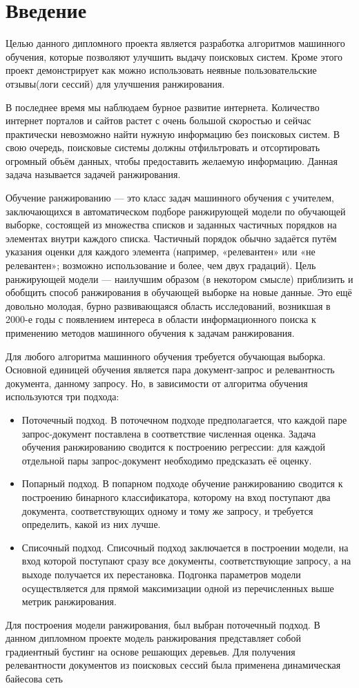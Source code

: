 \section*{Введение}

Целью данного дипломного проекта является разработка алгоритмов машинного обучения, которые позволяют улучшить выдачу поисковых систем. Кроме этого проект демонстрирует как можно использовать неявные пользовательские отзывы(логи сессий) для улучшения ранжирования. 

В последнее время мы наблюдаем бурное развитие интернета. Количество интернет порталов и сайтов растет с очень большой скоростью и сейчас практически невозможно найти нужную информацию без поисковых систем. В свою очередь, поисковые системы должны отфильтровать и отсортировать огромный объём данных, чтобы предоставить желаемую информацию. Данная задача называется задачей ранжирования. 

Обучение ранжированию — это класс задач машинного обучения с учителем, заключающихся в автоматическом подборе ранжирующей модели по обучающей выборке, состоящей из множества списков и заданных частичных порядков на элементах внутри каждого списка. Частичный порядок обычно задаётся путём указания оценки для каждого элемента (например, «релевантен» или «не релевантен»; возможно использование и более, чем двух градаций). Цель ранжирующей модели — наилучшим образом (в некотором смысле) приблизить и обобщить способ ранжирования в обучающей выборке на новые данные. Это ещё довольно молодая, бурно развивающаяся область исследований, возникшая в 2000-е годы с появлением интереса в области информационного поиска к применению методов машинного обучения к задачам ранжирования.

Для любого алгоритма машинного обучения требуется обучающая выборка. Основной единицей обучения является пара документ-запрос и релевантность документа, данному запросу. Но, в зависимости от алгоритма обучения используются три подхода: 
\begin{itemize}

	\item Поточечный подход. В поточечном подходе предполагается, что каждой паре запрос-документ поставлена в соответствие численная оценка. Задача обучения ранжированию сводится к построению регрессии: для каждой отдельной пары запрос-документ необходимо предсказать её оценку.

	\item Попарный подход. В попарном подходе обучение ранжированию сводится к построению бинарного классификатора, которому на вход поступают два документа, соответствующих одному и тому же запросу, и требуется определить, какой из них лучше.

	\item Списочный подход. Списочный подход заключается в построении модели, на вход которой поступают сразу все документы, соответствующие запросу, а на выходе получается их перестановка. Подгонка параметров модели осуществляется для прямой максимизации одной из перечисленных выше метрик ранжирования.

\end{itemize}

Для построения модели ранжирования, был выбран поточечный подход. В данном дипломном проекте модель ранжирования представляет собой градиентный бустинг на основе решающих деревьев. Для получения релевантности документов из поисковых сессий была применена динамическая байесова сеть